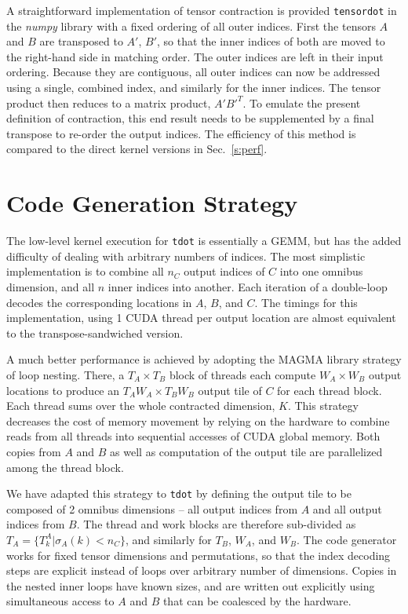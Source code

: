 \documentclass[preprint]{sigplanconf}
\begin{document}
  A straightforward implementation of tensor contraction is provided {\tt tensordot} in the {\em numpy} library
with a fixed ordering of all outer indices.\cite{numpy}
First the tensors $A$ and $B$ are transposed to $A'$, $B'$,
so that the inner indices of both are moved to the right-hand side in matching order.
The outer indices are left in their input ordering.  Because they are contiguous, all outer indices
can now be addressed using a single, combined index, and similarly for the inner indices.
The tensor product then reduces to a matrix product, $A' B'^T$.
To emulate the present definition of contraction, this end result needs to be supplemented
by a final transpose to re-order the output indices.  The efficiency of this method is compared to the
direct kernel versions in Sec.~\ref{s:perf}.

\section{ Code Generation Strategy}\label{s:gen}

  The low-level kernel execution for {\tt tdot} is essentially a GEMM, but
has the added difficulty of dealing with arbitrary numbers of indices.
The most simplistic implementation is to combine all $n_C$ output indices
of $C$ into one omnibus dimension, and all $n$ inner indices
into another.  Each iteration of a double-loop decodes the corresponding
locations in $A$, $B$, and $C$.  The timings for this implementation, using
1 CUDA thread per output location are almost equivalent to the transpose-sandwiched
version.

  A much better performance is achieved by adopting the MAGMA library
strategy of loop nesting.\cite{magma}  There, a $T_A \times T_B$ block of threads each
compute $W_A \times W_B$ output locations to produce an $T_A W_A \times T_B W_B$
output tile of $C$ for each thread block.  Each thread sums over the whole contracted
dimension, $K$.  This strategy decreases the cost of memory movement by relying on the
hardware to combine reads from all threads into sequential accesses of CUDA global memory.
Both copies from $A$ and $B$ as well
as computation of the output tile are parallelized among the thread block.

  We have adapted this strategy to {\tt tdot} by defining the output tile
to be composed of 2 omnibus dimensions -- all output indices from $A$
and all output indices from $B$.  The thread and work blocks are therefore sub-divided as
$T_A = \{T^A_k | \sigma_A(k) < n_C\}$, and similarly for $T_B$, $W_A$, and $W_B$.
The code generator works for fixed tensor dimensions and permutations, so that
the index decoding steps are explicit instead of loops over arbitrary number of dimensions.
Copies in the nested inner loops have known sizes, and are written out explicitly
using simultaneous access to $A$ and $B$ that can be coalesced by the hardware.
\end{document}
